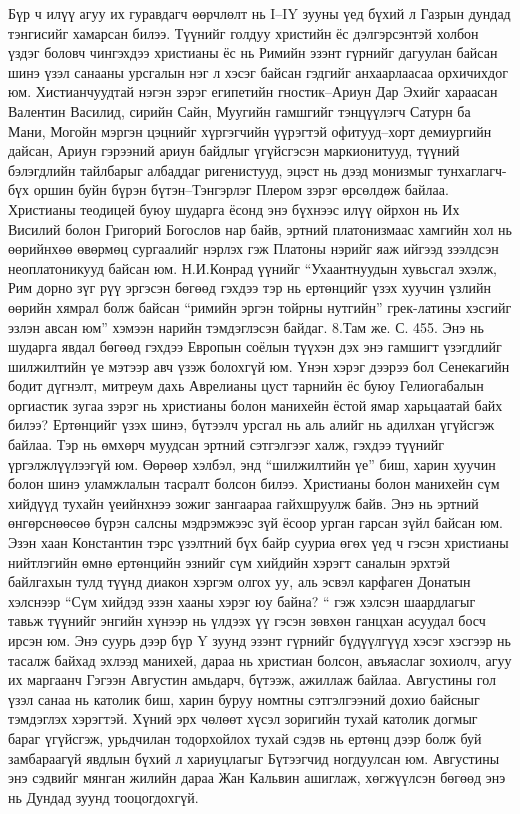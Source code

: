 Бүр ч илүү агуу их гуравдагч өөрчлөлт нь I–IY зууны үед бүхий л Газрын дундад тэнгисийг хамарсан билээ. Түүнийг голдуу христийн ёс дэлгэрсэнтэй холбон үздэг боловч чингэхдээ христианы ёс нь Римийн эзэнт гүрнийг дагуулан байсан шинэ үзэл санааны урсгалын нэг л хэсэг байсан гэдгийг анхаарлаасаа орхичихдог юм. Хистианчуудтай нэгэн зэрэг египетийн гностик–Ариун Дар Эхийг хараасан Валентин Василид, сирийн Сайн, Муугийн гамшгийг тэнцүүлэгч Сатурн ба Мани, Могойн мэргэн цэцнийг хүргэгчийн үүрэгтэй офитууд–хорт демиургийн дайсан, Ариун гэрээний ариун байдлыг үгүйсгэсэн маркионитууд, түүний бэлэгдлийн тайлбарыг албаддаг ригенистууд, эцэст нь дээд монизмыг тунхаглагч-бүх оршин буйн бүрэн бүтэн–Тэнгэрлэг Плером зэрэг өрсөлдөж байлаа. Христианы теодицей буюу шударга ёсонд энэ бүхнээс илүү ойрхон нь Их Висилий болон Григорий Богослов нар байв, эртний платонизмаас хамгийн хол нь өөрийнхөө өвөрмөц сургаалийг нэрлэх гэж Платоны нэрийг яаж ийгээд зээлдсэн неоплатоникууд байсан юм. Н.И.Конрад үүнийг “Ухаантнуудын хувьсгал эхэлж, Рим дорно зүг рүү эргэсэн бөгөөд гэхдээ тэр нь ертөнцийг үзэх хуучин үзлийн өөрийн хямрал болж байсан “римийн эргэн тойрны нутгийн” грек-латины хэсгийг эзлэн авсан юм” хэмээн нарийн тэмдэглэсэн байдаг. 8.Там же. С. 455.
Энэ нь шударга явдал бөгөөд гэхдээ Европын соёлын түүхэн дэх энэ гамшигт үзэгдлийг шилжилтийн үе мэтээр авч үзэж болохгүй юм. Үнэн хэрэг дээрээ бол Сенекагийн бодит дүгнэлт, митреум дахь Аврелианы цуст тарнийн ёс буюу Гелиогабалын оргиастик зугаа зэрэг нь христианы болон манихейн ёстой ямар харьцаатай байх билээ? Ертөнцийг үзэх шинэ, бүтээлч урсгал нь аль алийг нь адилхан үгүйсгэж байлаа. Тэр нь өмхөрч муудсан эртний сэтгэлгээг халж, гэхдээ түүнийг үргэлжлүүлээгүй юм. Өөрөөр хэлбэл, энд “шилжилтийн үе” биш, харин хуучин болон шинэ уламжлалын тасралт болсон билээ.
Христианы болон манихейн сүм хийдүүд тухайн үеийнхнээ зожиг зангаараа гайхшруулж байв. Энэ нь эртний өнгөрснөөсөө бүрэн салсны мэдрэмжээс зүй ёсоор урган гарсан зүйл байсан юм. Эзэн хаан Константин тэрс үзэлтний бүх байр сууриа өгөх үед ч гэсэн христианы нийтлэгийн өмнө ертөнцийн эзнийг сүм хийдийн хэрэгт саналын эрхтэй байлгахын тулд түүнд диакон хэргэм олгох уу, аль эсвэл карфаген Донатын хэлснээр “Сүм хийдэд эзэн хааны хэрэг юу байна? “ гэж хэлсэн шаардлагыг тавьж түүнийг энгийн хүнээр нь үлдээх үү гэсэн зөвхөн ганцхан асуудал босч ирсэн юм. Энэ суурь дээр бүр Y зуунд эзэнт гүрнийг бүдүүлгүүд хэсэг хэсгээр нь тасалж байхад эхлээд манихей, дараа нь христиан болсон, авъяаслаг зохиолч, агуу их маргаанч Гэгээн Августин амьдарч, бүтээж, ажиллаж байлаа. Августины гол үзэл санаа нь католик биш, харин буруу номтны сэтгэлгээний дохио байсныг тэмдэглэх хэрэгтэй. Хүний эрх чөлөөт хүсэл зоригийн тухай католик догмыг бараг үгүйсгэж, урьдчилан тодорхойлох тухай сэдэв нь ертөнц дээр болж буй замбараагүй явдлын бүхий л хариуцлагыг Бүтээгчид ногдуулсан юм. Августины энэ сэдвийг мянган жилийн дараа Жан Кальвин ашиглаж, хөгжүүлсэн бөгөөд энэ нь Дундад зуунд тооцогдохгүй.
